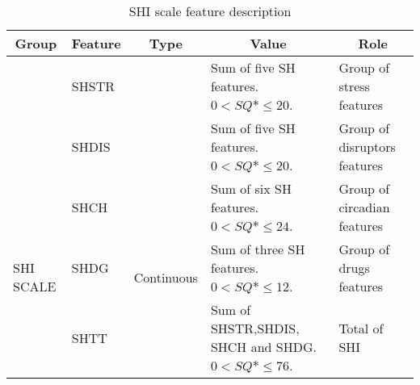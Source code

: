 \documentclass[10pt,letterpaper,oneside]{article}
\begin{document}
\begin{table}[ht]
	\centering
	\caption{SHI scale feature description}
	\label{tab:SHI-scale-feature-description}
	\begin{tabular}{|l|l|l|p{4cm}|p{4cm}|}
		\hline
		\multicolumn{1}{|c|}{\textbf{Group}} & \multicolumn{1}{c|}{\textbf{Feature}} & \multicolumn{1}{c|}{\textbf{Type}} & \multicolumn{1}{c|}{\textbf{Value}}                    & \multicolumn{1}{c|}{\textbf{Role}} \\ \hline
		          & SHSTR                                 &         & Sum of five SH features. $ 0 < SQ*\leq 20 $.           & Group of stress features           \\ \cline{2-2} \cline{4-5} 
		& SHDIS                                 &                                    & Sum of five SH features. $ 0 < SQ*\leq 20 $.           & Group of disruptors features       \\ \cline{2-2} \cline{4-5} 
		\multirow{5}{*}{SHI SCALE} & SHCH          &       \multirow{5}{*}{Continuous}                             & Sum of six SH features. $ 0 < SQ*\leq 24 $.            & Group of circadian features        \\ \cline{2-2} \cline{4-5} 
		& SHDG                                  &                                    & Sum of three SH features. $ 0 < SQ*\leq 12 $.          & Group of drugs features            \\ \cline{2-2} \cline{4-5} 
		& SHTT                                  &                                    & Sum of SHSTR,SHDIS, SHCH and SHDG. $ 0 < SQ*\leq 76 $. & Total of SHI                       \\ \hline
	\end{tabular}
\end{table}
\end{document}
